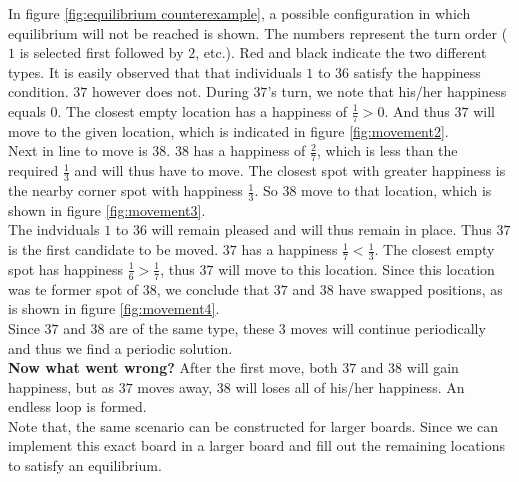 In figure \ref{fig:equilibrium counterexample}, a possible configuration in which  equilibrium will not be reached is shown. The numbers represent the turn order ($1$ is selected first followed by $2$, etc.). Red and black indicate  the two different types. It is easily observed that that individuals $1$ to $36$ satisfy the happiness condition. $37$ however does not. During $37$'s turn, we note that his/her happiness equals $0$. The closest empty location has a happiness of $\frac{1}{7} > 0$. And thus $37$ will move to the given location, which is indicated in figure \ref{fig:movement2}.
\\Next in line to move is $38$. $38$ has a happiness of $\frac{2}{7}$, which is less than the required $\frac{1}{3}$ and will thus have to move. The closest spot with greater happiness is the nearby corner spot with happiness $\frac{1}{3}$. So $38$ move to that location, which is shown in figure \ref{fig:movement3}.\\
The indviduals \(1\) to \(36\) will remain pleased and will thus remain in place. Thus  $37$ is the first candidate to be moved. $37$ has a happiness $\frac{1}{7} < \frac{1}{3}$. The closest empty spot has happiness $\frac{1}{6} > \frac{1}{7}$, thus $37$ will move to this location. Since this location was te former spot of \(38\), we conclude that  $37$ and $38$ have swapped positions, as is shown in figure \ref{fig:movement4}.\\
Since $37$ and $38$ are of the same type, these $3$ moves will continue periodically and thus we find a periodic solution.\\
\textbf{Now what went wrong?} After the first move, both $37$ and $38$ will gain happiness, but as \(37\) moves away, $38$ will loses all of his/her happiness. 
An endless loop is formed.\\
Note that, the same scenario can be constructed for larger boards. Since we can implement this exact board in a larger board and fill out the remaining locations to satisfy an equilibrium.
